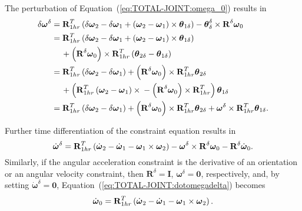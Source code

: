 \documentclass[10pt,dvips,fleqn,subeqn]{report}
\newcommand{\T}[1]{\bm{\mathbf{#1}}}
\begin{document}
The perturbation of Equation~(\ref{eq:TOTAL-JOINT:omega_0}) results in
\begin{align}
	\delta\T{\omega}^{\delta}
	&= \T{R}_{1hr}^T \plbr{
		\delta\T{\omega}_2
		- \delta\T{\omega}_1
		+ \plbr{\T{\omega}_2 - \T{\omega}_1}\times\T{\theta}_{1\delta}
	} - \T{\theta}_{\delta}^{\delta}\times\T{R}^{\delta}\T{\omega}_0 \nonumber \\
	&= \T{R}_{1hr}^T \plbr{
		\delta\T{\omega}_2
		- \delta\T{\omega}_1
		+ \plbr{\T{\omega}_2 - \T{\omega}_1}\times\T{\theta}_{1\delta}
	} \nonumber \\
	& \mbox{\hspace{12pt}}
	+ \plbr{\T{R}^{\delta}\T{\omega}_0}\times \T{R}_{1hr}^T \plbr{
		\T{\theta}_{2\delta}
		- \T{\theta}_{1\delta}
	} \nonumber \\
	&= \T{R}_{1hr}^T \plbr{
		\delta\T{\omega}_2
		- \delta\T{\omega}_1
	} + \plbr{\T{R}^{\delta}\T{\omega}_0}\times \T{R}_{1hr}^T \T{\theta}_{2\delta}
	\nonumber \\
	& \mbox{\hspace{12pt}}
	+ \plbr{
		\T{R}_{1hr}^T \plbr{\T{\omega}_2 - \T{\omega}_1}\times{}
		- \plbr{\T{R}^{\delta}\T{\omega}_0}\times \T{R}_{1hr}^T
	} \T{\theta}_{1\delta}
	\nonumber \\
	&= \T{R}_{1hr}^T \plbr{
		\delta\T{\omega}_2
		- \delta\T{\omega}_1
	} + \plbr{\T{R}^{\delta}\T{\omega}_0}\times \T{R}_{1hr}^T \T{\theta}_{2\delta}
	+ \T{\omega}^{\delta} \times \T{R}_{1hr}^T \T{\theta}_{1\delta} .
\end{align}

Further time differentiation of the constraint equation results in
\begin{equation}
	\dot{\T{\omega}}^{\delta}
	= \T{R}_{1hr}^T\plbr{
		\dot{\T{\omega}}_2
		- \dot{\T{\omega}}_1
		- \T{\omega}_1 \times \T{\omega}_2
	} - \T{\omega}^{\delta} \times \T{R}^{\delta} \T{\omega}_0
	- \T{R}^{\delta} \dot{\T{\omega}}_0 .
	\label{eq:TOTAL-JOINT:dotomegadelta}
\end{equation}
Similarly, if the angular acceleration constraint 
is the derivative of an orientation or an angular velocity constraint,
then $\T{R}^{\delta}=\T{I}$, $\T{\omega}^{\delta}=\T{0}$, respectively,
and, by setting $\dot{\T{\omega}}^{\delta}=\T{0}$,
Equation~(\ref{eq:TOTAL-JOINT:dotomegadelta}) becomes
\begin{equation}
	\dot{\T{\omega}}_0 = \T{R}_{1hr}^T\plbr{
		\dot{\T{\omega}}_2
		- \dot{\T{\omega}}_1
		- \T{\omega}_1 \times \T{\omega}_2
	} .
\end{equation}
\end{document}
